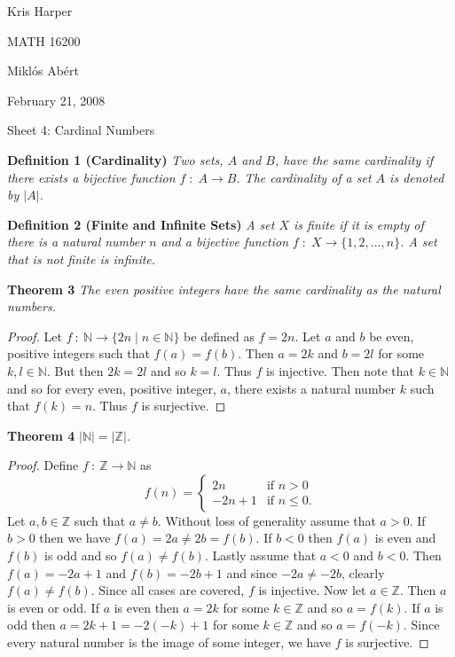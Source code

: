\documentclass{article}
\begin{document}
\begin{flushright}
Kris Harper

MATH 16200

Mikl\'{o}s Ab\'{e}rt

February 21, 2008
\end{flushright}

\begin{flushleft}

\Large

Sheet 4: Cardinal Numbers\newline

\normalsize

\textbf{Definition 1 (Cardinality)}
\textsl{Two sets, $A$ and $B$, have the same cardinality if there exists a bijective function $f \; : \; A \rightarrow B$. The cardinality of a set $A$ is denoted by $|A|$.}
\newline

\textbf{Definition 2 (Finite and Infinite Sets)}
\textsl{A set $X$ is finite if it is empty of there is a natural number $n$ and a bijective function $f \; : \; X \rightarrow \{1,2, \dots ,n\}$. A set that is not finite is infinite.}
\newline

\textbf{Theorem 3}
\textsl{The even positive integers have the same cardinality as the natural numbers.}
\begin{proof}
Let $f \: : \: \mathbb{N} \rightarrow \{2n \mid n \in \mathbb{N}\}$ be defined as $f=2n$. Let $a$ and $b$ be even, positive integers such that $f(a)=f(b)$. Then $a=2k$ and $b=2l$ for some $k,l \in \mathbb{N}$. But then $2k=2l$ and so $k=l$. Thus $f$ is injective. Then note that $k \in \mathbb{N}$ and so for every even, positive integer, $a$, there exists a natural number $k$ such that $f(k)=n$. Thus $f$ is surjective.
\end{proof}

\textbf{Theorem 4}
\textsl{$|\mathbb{N}|=|\mathbb{Z}|$.}
\begin{proof}
Define $f \: : \: \mathbb{Z} \rightarrow \mathbb{N}$ as
\[
f(n)=
\begin{cases}
2n & \text{if } n>0 \\
-2n+1 & \text{if } n \leq 0.
\end{cases}
\]
Let $a,b \in \mathbb{Z}$ such that $a \neq b$. Without loss of generality assume that $a > 0$. If $b > 0$ then we have $f(a)=2a \neq 2b=f(b)$. If $b<0$ then $f(a)$ is even and $f(b)$ is odd and so $f(a) \neq f(b)$. Lastly assume that $a<0$ and $b<0$. Then $f(a)=-2a+1$ and $f(b)=-2b+1$ and since $-2a \neq -2b$, clearly $f(a) \neq f(b)$. Since all cases are covered, $f$ is injective. Now let $a \in \mathbb{Z}$. Then $a$ is even or odd. If $a$ is even then $a=2k$ for some $k \in \mathbb{Z}$ and so $a=f(k)$. If $a$ is odd then $a=2k+1=-2(-k)+1$ for some $k \in \mathbb{Z}$ and so $a=f(-k)$. Since every natural number is the image of some integer, we have $f$ is surjective.
\end{proof}


\end{flushleft}
\end{document}
